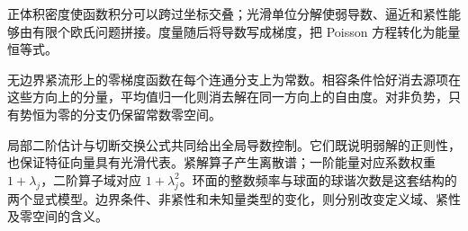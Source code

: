 






\begin{chaptersummary}
正体积密度使函数积分可以跨过坐标交叠；光滑单位分解使弱导数、逼近和紧性能够由有限个欧氏问题拼接。度量随后将导数写成梯度，把 Poisson 方程转化为能量恒等式。

无边界紧流形上的零梯度函数在每个连通分支上为常数。相容条件恰好消去源项在这些方向上的分量，平均值归一化则消去解在同一方向上的自由度。对非负势，只有势恒为零的分支仍保留常数零空间。

局部二阶估计与切断交换公式共同给出全局导数控制。它们既说明弱解的正则性，也保证特征向量具有光滑代表。紧解算子产生离散谱；一阶能量对应系数权重 \(1+\lambda_j\)，二阶算子域对应 \(1+\lambda_j^2\)。环面的整数频率与球面的球谐次数是这套结构的两个显式模型。边界条件、非紧性和未知量类型的变化，则分别改变定义域、紧性及零空间的含义。
\end{chaptersummary}

\BookExercises


